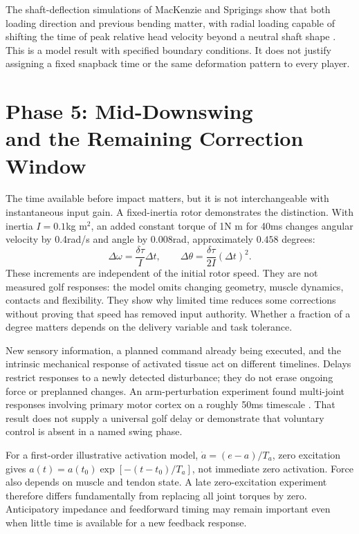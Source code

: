The shaft-deflection simulations of MacKenzie and Sprigings show that both loading direction and previous bending matter, with radial loading capable of shifting the time of peak relative head velocity beyond a neutral shaft shape \citep{MacKenzie2010Deflection}. This is a model result with specified boundary conditions. It does not justify assigning a fixed snapback time or the same deformation pattern to every player.

\section[Phase 5: Mid-Downswing and the Remaining Correction Window]{Phase 5: Mid-Downswing\\and the Remaining Correction Window}

The time available before impact matters, but it is not interchangeable with instantaneous input gain. A fixed-inertia rotor demonstrates the distinction. With inertia $I=0.1$kg m$^2$, an added constant torque of 1N m for 40ms changes angular velocity by 0.4rad/s and angle by 0.008rad, approximately $0.458$ degrees:
\begin{equation}
\Delta\omega=\frac{\delta\tau}{I}\Delta t,\qquad
\Delta\theta=\frac{\delta\tau}{2I}(\Delta t)^2.
\label{eq:complete_rotor}
\end{equation}
These increments are independent of the initial rotor speed. They are not measured golf responses: the model omits changing geometry, muscle dynamics, contacts and flexibility. They show why limited time reduces some corrections without proving that speed has removed input authority. Whether a fraction of a degree matters depends on the delivery variable and task tolerance.

New sensory information, a planned command already being executed, and the intrinsic mechanical response of activated tissue act on different timelines. Delays restrict responses to a newly detected disturbance; they do not erase ongoing force or preplanned changes. An arm-perturbation experiment found multi-joint responses involving primary motor cortex on a roughly 50ms timescale \citep{Pruszynski2011Feedback}. That result does not supply a universal golf delay or demonstrate that voluntary control is absent in a named swing phase.

For a first-order illustrative activation model, $\dot a=(e-a)/T_a$, zero excitation gives $a(t)=a(t_0)\exp[-(t-t_0)/T_a]$, not immediate zero activation. Force also depends on muscle and tendon state. A late zero-excitation experiment therefore differs fundamentally from replacing all joint torques by zero. Anticipatory impedance and feedforward timing may remain important even when little time is available for a new feedback response.

